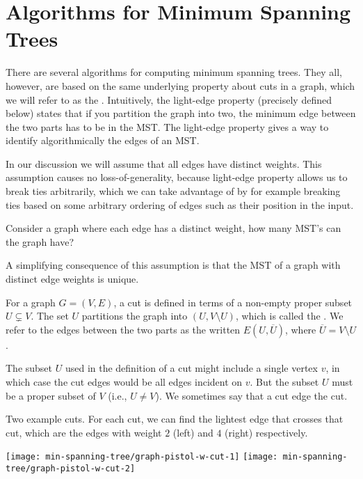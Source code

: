 \section{Algorithms for Minimum Spanning Trees}

There are several algorithms for computing minimum spanning trees.
They all, however, are based on the same underlying property about
cuts in a graph, which we will refer to as the .  Intuitively, the light-edge property (precisely defined
below) states that if you partition the graph into two, the minimum
edge between the two parts has to be in the MST.  The light-edge
property gives a way to identify algorithmically the edges of an MST.
%

In our discussion we will assume that all edges have distinct
weights. This assumption causes no loss-of-generality, because
light-edge property allows us to break ties arbitrarily, which we can
take advantage of by for example breaking ties based on some arbitrary
ordering of edges such as their position in the input.
%
\begin{question}
Consider a graph where each edge has a distinct weight, how many MST's
can the graph have?
\end{question}
%
A simplifying consequence of this assumption is that the MST of a
graph with distinct edge weights is unique.


\begin{definition}
For a graph $G = (V,E)$, a cut is defined in terms of a
non-empty proper subset $U \subsetneq V$.  The set $U$ partitions the
graph into $(U, V \setminus U)$, which is called the .
%
We refer to the edges between the two parts as the 
written $E(U,\overline{U})$, where $\overline{U} = V \setminus U$.
\end{definition}

The subset $U$ used in the definition of a cut might include a single
vertex $v$, in which case the cut edges would be all edges incident on
$v$.  But the subset $U$ must be a proper subset of $V$ (i.e., $U \neq
V$).  We sometimes say that a cut edge   the cut.



\begin{example}
Two example cuts.  For each cut, we can find the lightest edge that
crosses that cut, which are the edges with weight $2$ (left) and $4$
(right) respectively.
\begin{center}
\texttt{[image: min-spanning-tree/graph-pistol-w-cut-1]}
%
\hspace{1in}
%
\texttt{[image: min-spanning-tree/graph-pistol-w-cut-2]}
\end{center}
\end{example}



